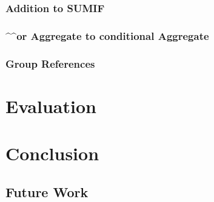 \documentclass[12pt,a4paper,onecolumn,oneside]{memoir}
\begin{document}
\subsection{Addition to SUMIF}

\subsection{\textasciicircum\textasciicircum or Aggregate to conditional Aggregate}

\subsection{Group References}

\chapter{Evaluation}


\chapter{Conclusion}

\section{Future Work}



\end{document}
